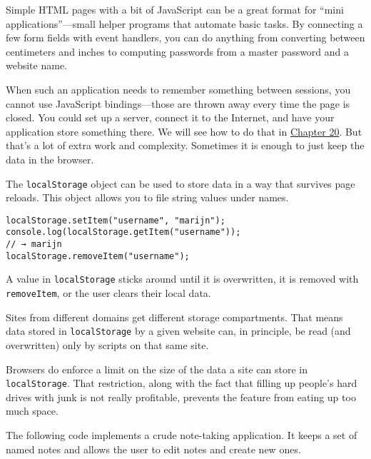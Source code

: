 Simple HTML pages with a bit of JavaScript can be a great format for ``mini applications''—small helper programs that automate basic tasks. By connecting a few form fields with event handlers, you can do anything from converting between centimeters and inches to computing passwords from a master password and a website name.

When such an application needs to remember something between sessions, you cannot use JavaScript bindings—those are thrown away every time the page is closed. You could set up a server, connect it to the Internet, and have your application store something there. We will see how to do that in \hyperref[node]{Chapter 20}. But that's a lot of extra work and complexity. Sometimes it is enough to just keep the data in the browser.

The \lstinline`localStorage` object can be used to store data in a way that survives page reloads. This object allows you to file string values under names.

\begin{lstlisting}
localStorage.setItem("username", "marijn");
console.log(localStorage.getItem("username"));
// → marijn
localStorage.removeItem("username");
\end{lstlisting}
\noindent{}

A value in \lstinline`localStorage` sticks around until it is overwritten, it is removed with \lstinline`removeItem`, or the user clears their local data.

Sites from different domains get different storage compartments. That means data stored in \lstinline`localStorage` by a given website can, in principle, be read (and overwritten) only by scripts on that same site.

Browsers do enforce a limit on the size of the data a site can store in \lstinline`localStorage`. That restriction, along with the fact that filling up people's hard drives with junk is not really profitable, prevents the feature from eating up too much space.

The following code implements a crude note-taking application. It keeps a set of named notes and allows the user to edit notes and create new ones.

